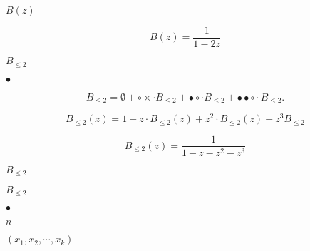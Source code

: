 \documentclass[10pt]{book}
\begin{document}
\begin{mdSnippets}
\begin{mdInlineSnippet}[73723f147a6eb605351fc7f278dcecef]
$B(z)$\end{mdInlineSnippet}%
\begin{mdDisplaySnippet}[0ff8cbcdaa74bf811c9d6c11d98b136b]%
\[%
B(z) = \frac{1}{1-2z}
\]%
\end{mdDisplaySnippet}%
\begin{mdInlineSnippet}[1115e702e0237b316fbda63a111a29e5]%
$B_{\leq 2}$\end{mdInlineSnippet}%
\begin{mdInlineSnippet}[71976219fb1234a4f2ba6bef7a046183]%
$\bullet$\end{mdInlineSnippet}%
\begin{mdDisplaySnippet}[76100419ded65de5176c361a72d8235b]%
\[%
B_{\leq2} = \emptyset + \circ\times \cdot B_{\leq2} + \bullet\circ \cdot B_{\leq2} 
+\bullet\bullet\circ \cdot B_{\leq2}.
\]%
\end{mdDisplaySnippet}%
\begin{mdDisplaySnippet}[59e23d24b1c0fc680c52b781f7c52136]%
\[%
B_{\leq2}(z) = 1 + z\cdot B_{\leq 2}(z) + z^2\cdot B_{\leq 2}(z)+z^3 B_{\leq2}
\]%
\end{mdDisplaySnippet}%
\begin{mdDisplaySnippet}[03b813d449780dc7000064dd40b5bf64]%
\[%
B_{\leq2}(z)  = \frac{1}{1 - z - z^2 - z^3}
\]%
\end{mdDisplaySnippet}%
\begin{mdInlineSnippet}[79cb4a2c6de0786af0273a19f0234091]%
$B_{\leq2}$\end{mdInlineSnippet}%
\begin{mdInlineSnippet}[79cb4a2c6de0786af0273a19f0234091]%
$B_{\leq2}$\end{mdInlineSnippet}%
\begin{mdInlineSnippet}[71976219fb1234a4f2ba6bef7a046183]%
$\bullet$\end{mdInlineSnippet}%
\begin{mdInlineSnippet}[7b8b965ad4bca0e41ab51de7b31363a1]%
$n$\end{mdInlineSnippet}%
\begin{mdInlineSnippet}%
$(x_1,x_2,\cdots,x_k)$\end{mdInlineSnippet}%

\end{mdSnippets}
\end{document}
